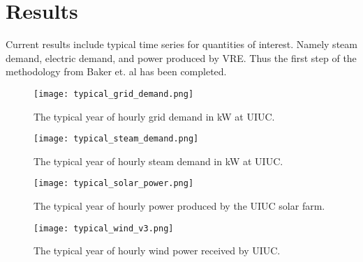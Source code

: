 \section{Results}

Current results include typical time series for quantities of interest. Namely steam demand, electric demand, and power produced by VRE. Thus the first step of the methodology from Baker et. al has been completed.

\begin{figure}[H]
 	\centering
 	\label{fig:grid-demand}
 	\texttt{[image: typical\_grid\_demand.png]}
 	\caption{The typical year of hourly grid demand in kW at UIUC.}
\end{figure} 
\begin{figure}[H]
	\centering
	\label{fig:steam-demand}
	\texttt{[image: typical\_steam\_demand.png]}
	\caption{The typical year of hourly steam demand in kW at UIUC.}
\end{figure}
\begin{figure}[H]
	\centering
	\label{fig:solar-power}
	\texttt{[image: typical\_solar\_power.png]}
	\caption{The typical year of hourly power produced by the UIUC solar farm.}
\end{figure}
\begin{figure}[H]
	\centering
	\label{fig:wind-power}
	\texttt{[image: typical\_wind\_v3.png]}
	\caption{The typical year of hourly wind power received by UIUC.}
\end{figure}